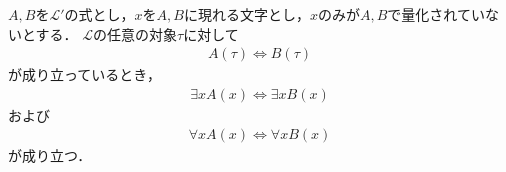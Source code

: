 	
	\begin{screen}
		\begin{logicalthm}[量化記号の性質(イ)]\label{logicalthm:properties_of_quantifiers}
			$A,B$を$\mathcal{L}'$の式とし，$x$を$A,B$に現れる文字とし，$x$のみが$A,B$で量化されていないとする．
			$\mathcal{L}$の任意の対象$\tau$に対して
			\begin{align}
				A(\tau) \Longleftrightarrow B(\tau)
			\end{align}
			が成り立っているとき，
			\begin{align}
				\exists x A(x) \Longleftrightarrow \exists x B(x)
			\end{align}
			および
			\begin{align}
				\forall x A(x) \Longleftrightarrow \forall x B(x)
			\end{align}
			が成り立つ．
		\end{logicalthm}
	\end{screen}
	
